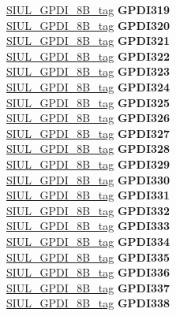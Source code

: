 \begin{DoxyCompactItemize}
\begin{tabbing}
\>\>\mbox{\hyperlink{unionSIUL__GPDI__8B__tag}{SIUL\_GPDI\_8B\_tag}} {\bfseries GPDI319}\\
\>\>\mbox{\hyperlink{unionSIUL__GPDI__8B__tag}{SIUL\_GPDI\_8B\_tag}} {\bfseries GPDI320}\\
\>\>\mbox{\hyperlink{unionSIUL__GPDI__8B__tag}{SIUL\_GPDI\_8B\_tag}} {\bfseries GPDI321}\\
\>\>\mbox{\hyperlink{unionSIUL__GPDI__8B__tag}{SIUL\_GPDI\_8B\_tag}} {\bfseries GPDI322}\\
\>\>\mbox{\hyperlink{unionSIUL__GPDI__8B__tag}{SIUL\_GPDI\_8B\_tag}} {\bfseries GPDI323}\\
\>\>\mbox{\hyperlink{unionSIUL__GPDI__8B__tag}{SIUL\_GPDI\_8B\_tag}} {\bfseries GPDI324}\\
\>\>\mbox{\hyperlink{unionSIUL__GPDI__8B__tag}{SIUL\_GPDI\_8B\_tag}} {\bfseries GPDI325}\\
\>\>\mbox{\hyperlink{unionSIUL__GPDI__8B__tag}{SIUL\_GPDI\_8B\_tag}} {\bfseries GPDI326}\\
\>\>\mbox{\hyperlink{unionSIUL__GPDI__8B__tag}{SIUL\_GPDI\_8B\_tag}} {\bfseries GPDI327}\\
\>\>\mbox{\hyperlink{unionSIUL__GPDI__8B__tag}{SIUL\_GPDI\_8B\_tag}} {\bfseries GPDI328}\\
\>\>\mbox{\hyperlink{unionSIUL__GPDI__8B__tag}{SIUL\_GPDI\_8B\_tag}} {\bfseries GPDI329}\\
\>\>\mbox{\hyperlink{unionSIUL__GPDI__8B__tag}{SIUL\_GPDI\_8B\_tag}} {\bfseries GPDI330}\\
\>\>\mbox{\hyperlink{unionSIUL__GPDI__8B__tag}{SIUL\_GPDI\_8B\_tag}} {\bfseries GPDI331}\\
\>\>\mbox{\hyperlink{unionSIUL__GPDI__8B__tag}{SIUL\_GPDI\_8B\_tag}} {\bfseries GPDI332}\\
\>\>\mbox{\hyperlink{unionSIUL__GPDI__8B__tag}{SIUL\_GPDI\_8B\_tag}} {\bfseries GPDI333}\\
\>\>\mbox{\hyperlink{unionSIUL__GPDI__8B__tag}{SIUL\_GPDI\_8B\_tag}} {\bfseries GPDI334}\\
\>\>\mbox{\hyperlink{unionSIUL__GPDI__8B__tag}{SIUL\_GPDI\_8B\_tag}} {\bfseries GPDI335}\\
\>\>\mbox{\hyperlink{unionSIUL__GPDI__8B__tag}{SIUL\_GPDI\_8B\_tag}} {\bfseries GPDI336}\\
\>\>\mbox{\hyperlink{unionSIUL__GPDI__8B__tag}{SIUL\_GPDI\_8B\_tag}} {\bfseries GPDI337}\\
\>\>\mbox{\hyperlink{unionSIUL__GPDI__8B__tag}{SIUL\_GPDI\_8B\_tag}} {\bfseries GPDI338}\\

\end{tabbing}
\end{DoxyCompactItemize}
